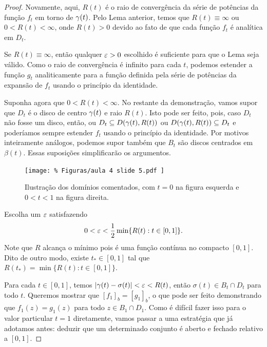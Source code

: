    \begin{proof}
        Novamente, aqui, $R(t)$ é o raio de convergência da série de potências da função 
        $f_t$ em torno de $\gamma(t)$. Pelo Lema anterior, temos que $R(t) \equiv \infty$ 
        ou $0 < R(t) < \infty$, onde $R(t) > 0$ devido ao fato de que cada função $f_t$ é
        analítica em $D_t$. 
        
        Se $R(t) \equiv \infty$, então qualquer $\varepsilon > 0$ escolhido é suficiente 
        para que o Lema seja válido. Como o raio de convergência é infinito para cada $t$,
        podemos estender a função $g_t$ analiticamente para a função definida pela série de
        potências da expansão de $f_t$ usando o princípio da identidade.
        
        Suponha agora que $0 < R(t) < \infty$. No restante da demonstração, vamos supor que 
        $D_t$ é o disco de centro $\gamma(t)$ e raio $R(t)$. Isto pode ser feito, pois, caso
        $D_t$ não fosse um disco, então, ou $D_t \subseteq D(\gamma(t),R(t))$ ou
        $D(\gamma(t),R(t)) \subseteq D_t$ e poderíamos sempre estender $f_t$ usando o 
        princípio da identidade. Por motivos inteiramente análogos, podemos supor também
        que $B_t$ são discos centrados em $\beta(t)$. Essas suposições simplificarão 
        os argumentos.
        \begin{figure}[H]\centering
            \texttt{[image: \%
                Figuras/aula 4 slide 5.pdf
            ]}
            \caption{%
                Ilustração dos domínios comentados, com $t=0$ na figura esquerda e $0<t<1$ na figura direita.
            }
        \end{figure}
        Escolha um $\varepsilon$ satisfazendo
        \begin{equation*}
        0 < \varepsilon < \frac{1}{2}\min\{R(t): t \in [0,1]\}.
        \end{equation*}
        Note que $R$ alcança o mínimo pois é uma função contínua no compacto $[0,1]$. 
        Dito de outro modo, existe $t_* \in [0,1]$ tal que $R(t_*) = \min\{R(t): t \in [0,1]\}$.
        
        Para cada $t \in [0,1]$, temos $|\gamma(t) - \sigma(t)| < \varepsilon < R(t)$, então
        $\sigma(t) \in B_t \cap D_t$ para todo $t$. Queremos mostrar que $[f_1]_b = [g_1]_b$, 
        o que pode ser feito demonstrando que $f_1(z) = g_1(z)$ para todo $z \in B_1 \cap D_1$. 
        Como é difícil fazer isso para o valor particular $t=1$ diretamente, vamos passar 
        a uma estratégia que já adotamos antes: deduzir que um determinado conjunto é aberto
        e fechado relativo a $[0,1]$.
        

\end{proof}
